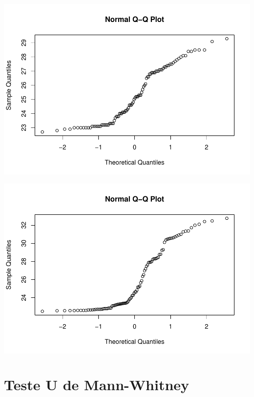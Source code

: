 \documentclass[
]{book}
\newenvironment{Shaded}{\begin{snugshade}}{\end{snugshade}}
\newcommand{\KeywordTok}[1]{\textcolor[rgb]{0.13,0.29,0.53}{\textbf{#1}}}
\newcommand{\NormalTok}[1]{#1}
\newcommand{\OperatorTok}[1]{\textcolor[rgb]{0.81,0.36,0.00}{\textbf{#1}}}
\begin{document}
\includegraphics{TudodoR_files/figure-latex/unnamed-chunk-260-1.pdf}

\begin{Shaded}
\end{Shaded}

\includegraphics{TudodoR_files/figure-latex/unnamed-chunk-260-2.pdf}

\hypertarget{teste-u-de-mann-whitney}{%
\section{Teste U de Mann-Whitney}\label{teste-u-de-mann-whitney}}
\end{document}
